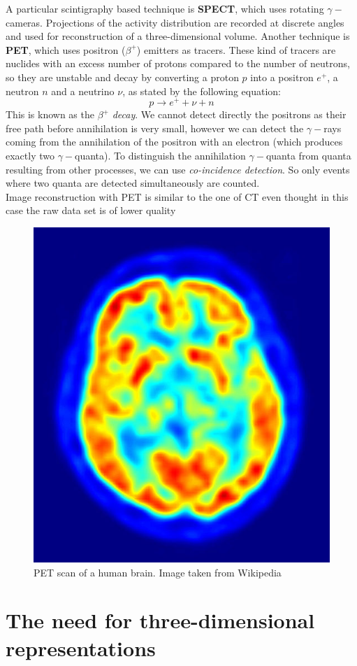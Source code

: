 A particular scintigraphy based technique is \textbf{SPECT}, which uses rotating $\gamma-$cameras. Projections of the activity distribution are recorded at discrete angles and used for reconstruction of a three-dimensional volume. Another technique is \textbf{PET}, which uses positron ($\beta^{+}$) emitters as tracers. These kind of tracers are nuclides with an excess number of protons compared to the number of neutrons, so they are unstable and decay by converting a proton $p$ into a positron $e^{+}$, a neutron $n$ and a neutrino $\nu$, as stated by the following equation:
\begin{equation}
 p \rightarrow e^{+} + \nu + n
\end{equation}
This is known as the $\beta^{+}$ \textit{decay}. We cannot detect directly the positrons as their free path before annihilation is very small, however we can detect the $\gamma-$rays coming from the annihilation of the positron with an electron (which produces exactly two $\gamma-$quanta). To distinguish the annihilation $\gamma-$quanta from quanta resulting from other processes, we can use \textit{co-incidence detection}. So only events where two quanta are detected simultaneously are counted.\\

Image reconstruction with PET is similar to the one of CT even thought in this case the raw data set is of lower quality

\begin{figure}[htb] %
   \centering
   \includegraphics[width=0.30\linewidth]{images/PET.jpg}
   \caption[PET scan of a brain]{PET scan of a human brain. Image taken from Wikipedia}
   \label{fig:pet}
\end{figure}

\section{The need for three-dimensional representations}\label{sec13:3drepresentations}

